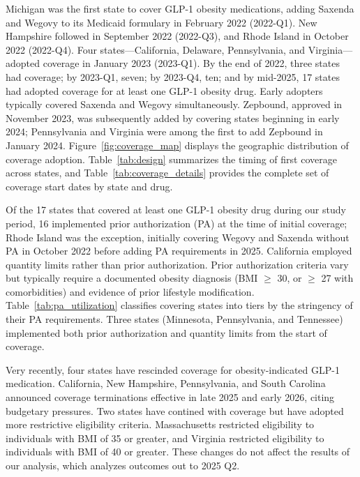 Michigan was the first state to cover GLP-1 obesity medications, adding Saxenda and Wegovy to its Medicaid formulary in February 2022 (2022-Q1). New Hampshire followed in September 2022 (2022-Q3), and Rhode Island in October 2022 (2022-Q4). Four states---California, Delaware, Pennsylvania, and Virginia---adopted coverage in January 2023 (2023-Q1). By the end of 2022, three states had coverage; by 2023-Q1, seven; by 2023-Q4, ten; and by mid-2025, 17 states had adopted coverage for at least one GLP-1 obesity drug. Early adopters typically covered Saxenda and Wegovy simultaneously. Zepbound, approved in November 2023, was subsequently added by covering states beginning in early 2024; Pennsylvania and Virginia were among the first to add Zepbound in January 2024. Figure~\ref{fig:coverage_map} displays the geographic distribution of coverage adoption. Table~\ref{tab:design} summarizes the timing of first coverage across states, and Table~\ref{tab:coverage_details} provides the complete set of coverage start dates by state and drug.

Of the 17 states that covered at least one GLP-1 obesity drug during our study period, 16 implemented prior authorization (PA) at the time of initial coverage; Rhode Island was the exception, initially covering Wegovy and Saxenda without PA in October 2022 before adding PA requirements in 2025. California employed quantity limits rather than prior authorization. Prior authorization criteria vary but typically require a documented obesity diagnosis (BMI $\ge$ 30, or $\ge$ 27 with comorbidities) and evidence of prior lifestyle modification. Table~\ref{tab:pa_utilization} classifies covering states into tiers by the stringency of their PA requirements. Three states (Minnesota, Pennsylvania, and Tennessee) implemented both prior authorization and quantity limits from the start of coverage.

Very recently, four states have rescinded coverage for obesity-indicated GLP-1 medication. California, New Hampshire, Pennsylvania, and South Carolina announced coverage terminations effective in late 2025 and early 2026, citing budgetary pressures. Two states have contined with coverage but have adopted more restrictive eligibility criteria. Massachusetts restricted eligibility to individuals with BMI of 35 or greater, and Virginia restricted eligibility to individuals with BMI of 40 or greater. These changes do not affect the results of our analysis, which analyzes outcomes out to 2025 Q2.


